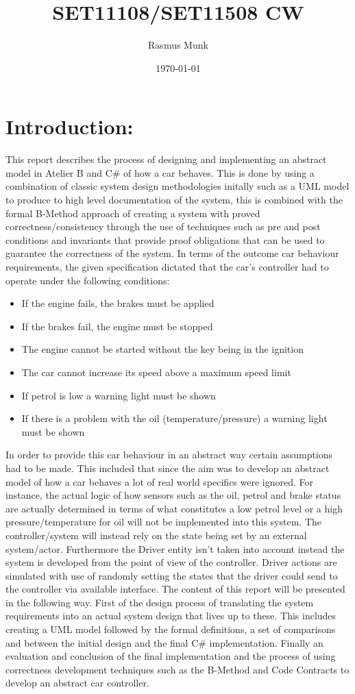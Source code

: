 \documentclass[12pt]{article}
\title{SET11108/SET11508 CW}
\author{Rasmus Munk}
\date{\today}
\begin{document}
\section{Introduction:}
This report describes the process of designing and implementing an abstract model in Atelier B and C\# of how a car behaves. This is done by using a combination of classic system design methodologies initally such as a UML model to produce to high level documentation of the system, this is combined with the formal B-Method approach of creating a system with proved correctness/consistency through the use of techniques such as pre and post conditions and invariants that provide proof obligations that can be used to guarantee the correctness of the system. In terms of the outcome car behaviour requirements, the given specification dictated that the car’s controller had to operate under the following conditions:
\begin{itemize}
	\label{list:requirements}
	\item If the engine fails, the brakes must be applied
	\item If the brakes fail, the engine must be stopped
	\item The engine cannot be started without the key being in the ignition
	\item The car cannot increase its speed above a maximum speed limit
	\item If petrol is low a warning light must be shown
	\item If there is a problem with the oil (temperature/pressure) a warning light must be shown
\end{itemize}

In order to provide this car behaviour in an abstract way certain assumptions had to be made. This included that since the aim was to develop an abstract model of how a car behaves a lot of real world specifics were ignored. For instance, the actual logic of how sensors such as the oil, petrol and brake status are actually determined in terms of what constitutes a low petrol level or a high pressure/temperature for oil will not be implemented into this system. The controller/system will instead rely on the state being set by an external system/actor. Furthermore the Driver entity isn't taken into account instead the system is developed from the point of view of the controller. Driver actions are simulated with use of randomly setting the states that the driver could send to the controller via available interface. The content of this report will be presented in the following way. First of the design process of translating the system requirements into an actual system design that lives up to these. This includes creating a UML model followed by the formal definitions, a set of comparisons and between the initial design and the final C\# implementation. Finally an evaluation and conclusion of the final implementation and the process of using correctness development techniques such as the B-Method and Code Contracts to develop an abstract car controller.
\end{document}
